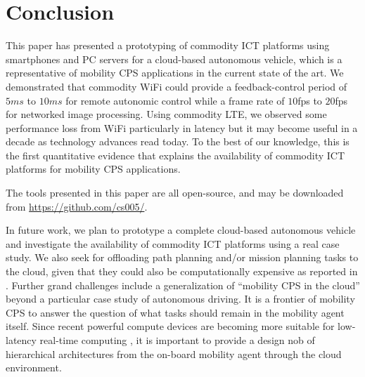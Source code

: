 \section{Conclusion}
\label{sec:conclusion}

This paper has presented a prototyping of commodity ICT platforms using
smartphones and PC servers for a cloud-based autonomous vehicle, which
is a representative of mobility CPS applications in the current state of
the art.
We demonstrated that commodity WiFi could provide a feedback-control
period of $5ms$ to $10ms$ for remote autonomic control while a frame
rate of $10$fps to $20$fps for networked image processing.
Using commodity LTE, we observed some performance loss from WiFi
particularly in latency but it may become useful in a decade as
technology advances read today.
To the best of our knowledge, this is the first quantitative evidence
that explains the availability of commodity ICT platforms for mobility
CPS applications.

The tools presented in this paper are all open-source, and may be
downloaded from \url{https://github.com/cs005/}.

In future work, we plan to prototype a complete cloud-based autonomous
vehicle and investigate the availability of commodity ICT platforms
using a real case study.
We also seek for offloading path planning and/or mission planning tasks
to the cloud, given that they could also be computationally expensive as
reported in \cite{McNaughton_ICRA11}.
Further grand challenges include a generalization of ``mobility CPS in
the cloud'' beyond a particular case study of autonomous driving.
It is a frontier of mobility CPS to answer the question of what tasks
should remain in the mobility agent itself.
Since recent powerful compute devices are becoming more suitable for
low-latency real-time computing \cite{Kato13}, it is important to
provide a design nob of hierarchical architectures from the on-board
mobility agent through the cloud environment.